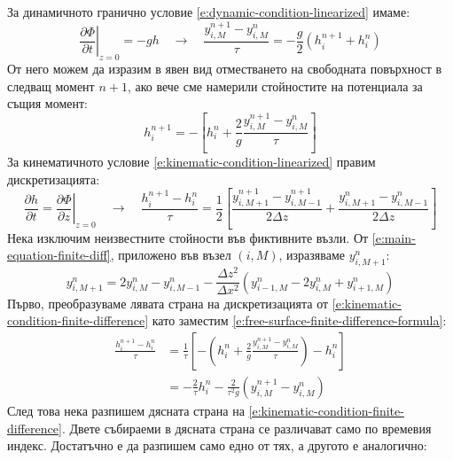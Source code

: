 \documentclass[12pt]{article}
\numberwithin{equation}{section}
\begin{document}
За динамичното гранично условие \autoref{e:dynamic-condition-linearized} имаме:
\begin{equation}
    \label{e:dynamic-condition-finite-difference}
    \left. \frac{\partial \Phi}{\partial t} \right|_{z=0} = -gh
    \quad\rightarrow\quad
    \frac{y^{n+1}_{i,M} - y^n_{i,M}}{\tau} = -\frac{g}{2} (h^{n+1}_i + h^n_i)
\end{equation}
От него можем да изразим в явен вид отместването на свободната повърхност в следващ момент $n+1$, ако вече сме намерили стойностите на потенциала за същия момент:
\begin{equation}
    \label{e:free-surface-finite-difference-formula}
    h^{n+1}_i = - \left[ h^n_i + \frac{2}{g} \frac{y^{n+1}_{i,M} - y^n_{i,M}}{\tau} \right]
\end{equation}
За кинематичното условие \autoref{e:kinematic-condition-linearized} правим дискретизацията:
\begin{equation}
    \label{e:kinematic-condition-finite-difference}
    \frac{\partial h}{\partial t} = \left. \frac{\partial \Phi}{\partial z} \right|_{z=0}
    \quad\rightarrow\quad
    \frac{h^{n+1}_i - h^n_i}{\tau}
    = \frac{1}{2} \left[ \frac{y^{n+1}_{i,M+1} - y^{n+1}_{i,M-1}}{2\Delta z} + \frac{y^n_{i,M+1} - y^n_{i,M-1}}{2\Delta z} \right]
\end{equation}
Нека изключим неизвестните стойности във фиктивните възли. От \autoref{e:main-equation-finite-diff}, приложено във възел $(i,M)$, изразяваме $y^n_{i,M+1}$:
\begin{equation}
    y^n_{i,M+1} = 2y^n_{i,M} - y^n_{i,M-1} - \frac{\Delta z^2}{\Delta x^2} (y^n_{i-1,M} - 2y^n_{i,M} + y^n_{i+1,M})
\end{equation}
Първо, преобразуваме лявата страна на дискретизацията от \autoref{e:kinematic-condition-finite-difference} като заместим \autoref{e:free-surface-finite-difference-formula}:
\begin{equation}
    \begin{aligned}
        \frac{h^{n+1}_i - h^n_i}{\tau}
        &= \frac{1}{\tau} \left[ - \left( h^n_i + \frac{2}{g} \frac{y^{n+1}_{i,M} - y^n_{i,M}}{\tau} \right) -h^n_i \right] \\
        &= -\frac{2}{\tau}h^n_i - \frac{2}{\tau^2 g}(y^{n+1}_{i,M} - y^n_{i,M})
    \end{aligned}
\end{equation}
След това нека разпишем дясната страна на \autoref{e:kinematic-condition-finite-difference}. Двете събираеми в дясната страна се различават само по времевия индекс. Достатъчно е да разпишем само едно от тях, а другото е аналогично:
\end{document}

